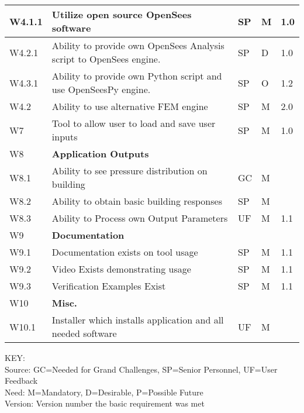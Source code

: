 \begin{longtable}{| p{} | p{} | p{} | p{} |  p{} |}
W4.1.1 & Utilize open source OpenSees software & SP & M & 1.0 \\ \hline
W4.2.1 & Ability to provide own OpenSees Analysis script to OpenSees engine. & SP & D & 1.0 \\ \hline
W4.3.1 & Ability to provide own Python script and use OpenSeesPy engine. & SP & O & 1.2 \\ \hline
W4.2 & Ability to use alternative FEM engine & SP & M & 2.0 \\ \hline


     W7 & Tool to allow user to load and save user inputs & SP & M & 1.0 \\ \hline
    W8 & \textbf{Application Outputs} &  &  \\ \hline
    W8.1 & Ability to see pressure distribution on building & GC & M &   \\ \hline
    W8.2 & Ability to obtain basic building responses & SP & M &   \\ \hline
    W8.3 & Ability to Process own Output Parameters & UF & M & 1.1  \\ \hline
    W9 & \textbf{Documentation} &  &  \\ \hline
    W9.1 & Documentation exists on tool usage & SP & M & 1.1  \\ \hline
    W9.2 & Video Exists demonstrating usage & SP & M & 1.1  \\ \hline
    W9.3 & Verification Examples Exist & SP & M & 1.1  \\ \hline
    W10 & \textbf{Misc.} &  &  \\ \hline
    W10.1 & Installer  which installs application and all needed software & UF & M &   \\ \hline
	\bottomrule 
               
\end{longtable}

\noindent
KEY:\\
Source: GC=Needed for Grand Challenges, SP=Senior Personnel, UF=User Feedback \\
Need: M=Mandatory, D=Desirable, P=Possible Future \\
Version: Version number the basic requirement was met 



